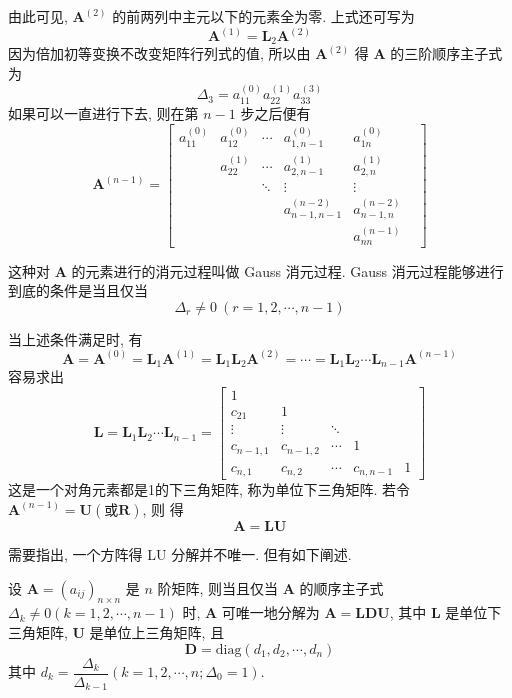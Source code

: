 由此可见, $\bm{A}^{(2)}$ 的前两列中主元以下的元素全为零. 上式还可写为
$$
    \bm{A}^{(1)} = \bm{L}_2\bm{A}^{(2)}
$$
因为倍加初等变换不改变矩阵行列式的值, 所以由 $\bm{A}^{(2)}$ 得 $\bm{A}$ 的三阶顺序主子式为
$$
    \Delta_3 = a_{11}^{(0)}a_{22}^{(1)}a_{33}^{(3)}
$$
如果可以一直进行下去, 则在第 $n - 1$ 步之后便有
$$
    \bm{A}^{(n - 1)} = \begin{bmatrix}
        a_{11}^{(0)} & a_{12}^{(0)} & \cdots & a_{1,n-1}^{(0)}          & a_{1n}^{(0)}        \\
                     & a_{22}^{(1)} & \cdots & a_{2, n-1}^{(1)}         & a_{2, n}^{(1)}      \\
                     &              & \ddots & \vdots                   & \vdots            & \\
                     &              &        & a_{n - 1, n - 1}^{(n-2)} & a_{n-1,n}^{(n-2)}   \\
                     &              &        &                          & a_{nn}^{(n-1)}
    \end{bmatrix}
$$
\par 这种对 $\bm{A}$ 的元素进行的消元过程叫做 Gauss 消元过程. Gauss 消元过程能够进行到底的条件是当且仅当
$$
    \Delta_r \neq 0 \ (r = 1,2,\cdots, n - 1)
$$
\par 当上述条件满足时, 有
$$
    \bm{A} = \bm{A}^{(0)} = \bm{L}_1\bm{A}^{(1)} = \bm{L}_1\bm{L}_2\bm{A}^{(2)} = \cdots = \bm{L}_1\bm{L}_2\cdots\bm{L}_{n-1}\bm{A}^{(n-1)}
$$
容易求出
$$
    \bm{L} = \bm{L}_1\bm{L}_2\cdots\bm{L}_{n-1} = \begin{bmatrix}
        1         &           &        &           &   \\
        c_{21}    & 1         &        &           &   \\
        \vdots    & \vdots    & \ddots &           &   \\
        c_{n-1,1} & c_{n-1,2} & \cdots & 1         &   \\
        c_{n,1}   & c_{n,2}   & \cdots & c_{n,n-1} & 1
    \end{bmatrix}
$$
这是一个对角元素都是1的下三角矩阵, 称为单位下三角矩阵. 若令 $\bm{A}^{(n-1)} = \bm{U}(或 \bm{R})$, 则
得
$$
    \bm{A} = \bm{LU}
$$

\par 需要指出, 一个方阵得 LU 分解并不唯一. 但有如下阐述.

\par 设 $\bm{A} = (a_{ij})_{n\times n}$ 是 $n$ 阶矩阵, 则当且仅当 $\bm{A}$ 的顺序主子式 $\Delta_k \neq 0(k=1,2,\cdots, n-1)$
时, $\bm{A}$ 可唯一地分解为 $\bm{A} = \bm{LDU}$, 其中 $\bm{L}$ 是单位下三角矩阵, $\bm{U}$ 是单位上三角矩阵, 且
$$
    \bm{D} = \mathrm{diag}(d_1, d_2, \cdots, d_n)
$$
其中 $d_k = \dfrac{\Delta_k}{\Delta_{k-1}}(k = 1,2,\cdots, n; \Delta_0 = 1)$.

